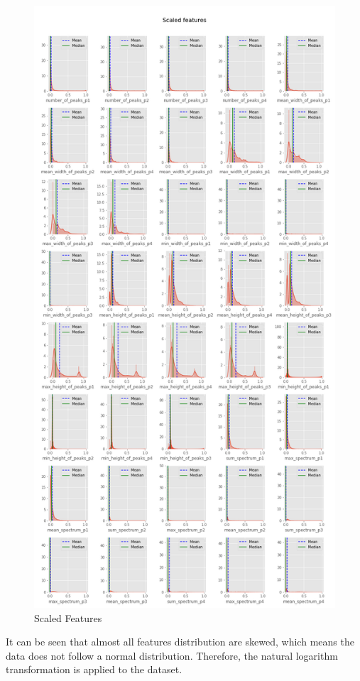 \documentclass[11pt]{article}
\makeatletter
\def\maxwidth{\ifdim\Gin@nat@width>\linewidth\linewidth
    \else\Gin@nat@width\fi}
\let\Oldincludegraphics\includegraphics
\renewcommand{\includegraphics}[1]{\Oldincludegraphics[width=.8\maxwidth]{#1}}
\makeatother
\begin{document}
\begin{figure}
\centering
\includegraphics{dist_minmax_scaled.png}
\caption{Scaled Features}
\end{figure}

It can be seen that almost all features distribution are skewed, which
means the data does not follow a normal distribution. Therefore, the
natural logarithm transformation is applied to the dataset.
\end{document}

